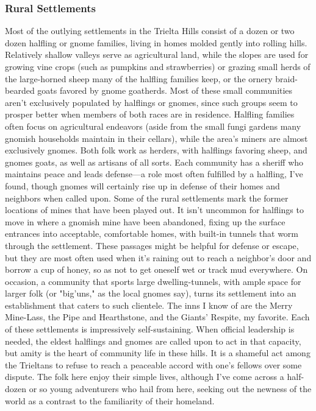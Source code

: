 \documentclass[10pt,a4paper,twoside,twocolumn,openany,bg=print,nodeprecatedcode]{dndbook}
\begin{document}
\subsubsection{Rural Settlements}
Most of the outlying settlements in the Trielta Hills consist of a dozen or two dozen halfling or gnome families, living in homes molded gently into rolling hills. Relatively shallow valleys serve as agricultural land, while the slopes are used for growing vine crops (such as pumpkins and strawberries) or grazing small herds of the large-horned sheep many of the halfling families keep, or the ornery braid-bearded goats favored by gnome goatherds.
Most of these small communities aren't exclusively populated by halflings or gnomes, since such groups seem to prosper better when members of both races are in residence. Halfling families often focus on agricultural endeavors (aside from the small fungi gardens many gnomish households maintain in their cellars), while the area's miners are almost exclusively gnomes. Both folk work as herders, with halflings favoring sheep, and gnomes goats, as well as artisans of all sorts. Each community has a sheriff who maintains peace and leads defense—a role most often fulfilled by a halfling, I've found, though gnomes will certainly rise up in defense of their homes and neighbors when called upon.
Some of the rural settlements mark the former locations of mines that have been played out. It isn't uncommon for halflings to move in where a gnomish mine have been abandoned, fixing up the surface entrances into acceptable, comfortable homes, with built-in tunnels that worm through the settlement. These passages might be helpful for defense or escape, but they are most often used when it's raining out to reach a neighbor's door and borrow a cup of honey, so as not to get oneself wet or track mud everywhere.
On occasion, a community that sports large dwelling-tunnels, with ample space for larger folk (or "big'uns," as the local gnomes say), turns its settlement into an establishment that caters to such clientele. The inns I know of are the Merry Mine-Lass, the Pipe and Hearthstone, and the Giants' Respite, my favorite.
Each of these settlements is impressively self-sustaining. When official leadership is needed, the eldest halflings and gnomes are called upon to act in that capacity, but amity is the heart of community life in these hills. It is a shameful act among the Trieltans to refuse to reach a peaceable accord with one's fellows over some dispute. The folk here enjoy their simple lives, although I've come across a half-dozen or so young adventurers who hail from here, seeking out the newness of the world as a contrast to the familiarity of their homeland.
\end{document}

